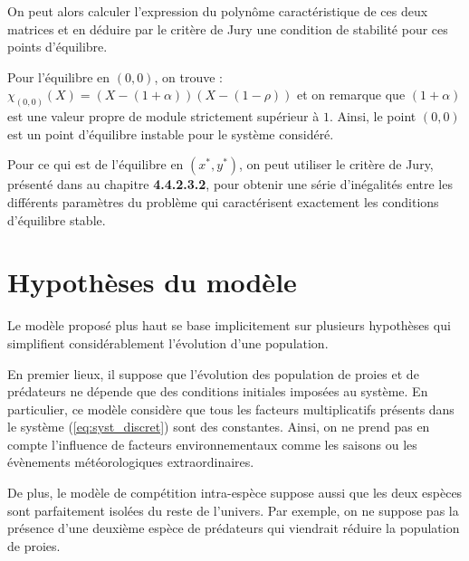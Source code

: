 On peut alors calculer l'expression du polynôme caractéristique de ces deux matrices et en déduire par le critère de Jury une condition de stabilité pour ces points d'équilibre.

Pour l'équilibre en $(0,0)$, on trouve : $\chi_{(0,0)} (X) = (X - (1 + \alpha))(X - (1 - \rho))$ et on remarque que $(1 + \alpha)$ est une valeur propre de module strictement supérieur à $1$. Ainsi, le point $(0, 0)$ est un point d'équilibre instable pour le système considéré.

Pour ce qui est de l'équilibre en $(x^*, y^*)$, on peut utiliser le critère de Jury, présenté dans \cite{Chevet22fr} au chapitre \textbf{4.4.2.3.2}, pour obtenir une série d'inégalités entre les différents paramètres du problème qui caractérisent exactement les conditions d'équilibre stable.

\section{Hypothèses du modèle}
\label{sec:Hypotheses}

Le modèle proposé plus haut se base implicitement sur plusieurs hypothèses qui simplifient considérablement l'évolution d'une population.

En premier lieux, il suppose que l'évolution des population de proies et de prédateurs ne dépende que des conditions initiales imposées au système. En particulier, ce modèle considère que tous les facteurs multiplicatifs présents dans le système (\ref{eq:syst_discret}) sont des constantes. Ainsi, on ne prend pas en compte l'influence de facteurs environnementaux comme les saisons ou les évènements météorologiques extraordinaires.

De plus, le modèle de compétition intra-espèce suppose aussi que les deux espèces sont parfaitement isolées du reste de l'univers. Par exemple, on ne suppose pas la présence d'une deuxième espèce de prédateurs qui viendrait réduire la population de proies.
